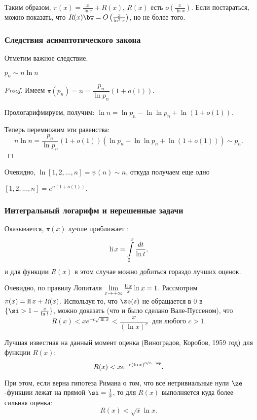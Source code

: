 
Таким образом, $\pi(x)=\frac{x}{\ln x}+R(x)$, $R(x)$ есть 
$o\left(\frac{x}{\ln x}\right)$. Если постараться, можно показать, что 
$R(x)\bw=O\left(\frac{x}{\ln^2x}\right)$, но не более того.	

\subsubsection{Следствия асимптотического закона}

Отметим важное следствие.
\begin{imp}
  $p_n \sim n \ln n$
\end{imp}
\begin{proof}
  Имеем $\pi(p_n) = n = \dfrac{p_n}{\ln p_n} (1 + o(1))$. 

	Прологарифмируем, получим: $\ln n = \ln p_n - \ln\ln p_n + \ln (1 + o(1))$. 

	Теперь перемножим	эти равенства: 
	$$
		n \ln n = \frac{p_n}{\ln p_n} (1 + o(1))(\ln p_n - \ln\ln p_n
	 + \ln(1 + o(1))) \sim p_n.
	$$
\end{proof}

Очевидно, $\ln[1,2,\dots,n] = \psi(n) \sim n$, откуда получаем еще одно
\begin{imp}
	$[1,2,\dots,n] = e^{n(1+o(1))}$.
\end{imp}

\subsubsection{Интегральный логарифм и нерешенные задачи}

Оказывается, $\pi(x)$ лучше приближает : 
$$\operatorname{li} x = \int\limits_2^x\frac{dt}{\ln t},$$ и для функции $R(x)$ в этом 
случае можно добиться гораздо лучших оценок.

Очевидно, по правилу Лопиталя
$\lim\limits_{x\to+\infty} \frac{\operatorname{li} x}{x}\ln x = 1$. Рассмотрим 
$\pi(x)=\operatorname{li} x+R(x)$. Используя то, что $\ze(s)$ не обращается в $0$ в
$\{\si>1-\frac{c}{\ln t}\}$, можно доказать (что и было сделано Вале-Пуссеном),
что $$R(x)<xe^{-c\sqrt{\ln x}}<\frac{x}{(\ln x)^c}\,\text{ для любого } c>1.$$

Лучшая известная на данный момент оценка (Виноградов, Коробов, 1959 год) для
функции $R(x)$: $$R(x)<xe^{-c(\ln x)^{3/5-\ep}}.$$

При этом, если верна гипотеза Римана о том, что все нетривиальные нули 
$\ze$-функции лежат на прямой $\si=\frac12$, то для $R(x)$ выполняется куда 
более сильная оценка: $$R(x)<\sqrt{x}\ln x.$$

